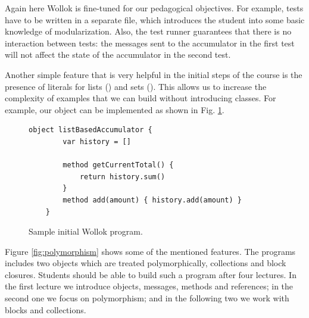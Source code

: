 Again here Wollok is fine-tuned for our pedagogical objectives.
For example, tests have to be written in a separate file, which introduces the student into some basic knowledge of modularization.
Also, the test runner guarantees that there is no interaction between tests: the messages sent to the accumulator in the first test will not affect the state of the accumulator in the second test.

\medskip
Another simple feature that is very helpful in the initial steps of the course is the presence of literals for lists (\eg \code{[1,2,3]}) and sets (\eg {}).
This allows us to increase the complexity of examples that we can build without introducing classes.
For example, our  object can be implemented as shown in Fig. \ref{fig:accumulator/list}.

\begin{figure}[ht]
 \centering
 \begin{lstlisting}[language=Wollok]
	object listBasedAccumulator {
		var history = []
		
		method getCurrentTotal() { 
			return history.sum() 
		}
		method add(amount) { history.add(amount) }
	}
 \end{lstlisting}
 
 \caption{\small Sample initial Wollok program.}
 \label{fig:accumulator/list}
\end{figure}

Figure \ref{fig:polymorphism} shows some of the mentioned features.
The programs includes two objects which are treated polymorphically, collections and block closures.
Students should be able to build such a program after four lectures.
In the first lecture we introduce objects, messages, methods and references;
in the second one we focus on polymorphism;
and in the following two we work with blocks and collections.


